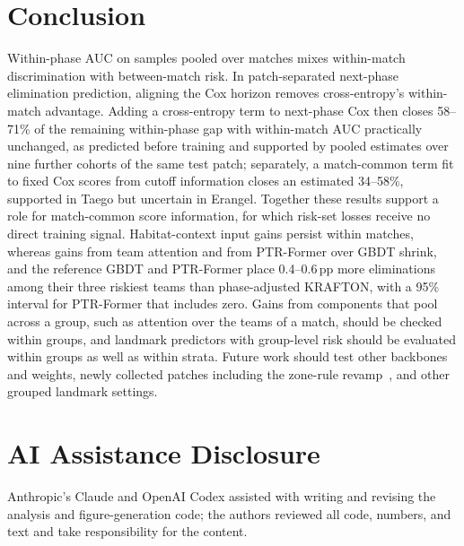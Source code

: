 \documentclass[sigconf,anonymous,nonacm]{acmart}
\begin{document}
\section{Conclusion}
\label{sec:conclusion}
Within-phase AUC on samples pooled over matches mixes within-match discrimination with between-match risk. In patch-separated next-phase elimination prediction, aligning the Cox horizon removes cross-entropy's within-match advantage. Adding a cross-entropy term to next-phase Cox then closes 58--71\% of the remaining within-phase gap with within-match AUC practically unchanged, as predicted before training and supported by pooled estimates over nine further cohorts of the same test patch; separately, a match-common term fit to fixed Cox scores from cutoff information closes an estimated 34--58\%, supported in Taego but uncertain in Erangel. Together these results support a role for match-common score information, for which risk-set losses receive no direct training signal. Habitat-context input gains persist within matches, whereas gains from team attention and from PTR-Former over GBDT shrink, and the reference GBDT and PTR-Former place 0.4--0.6\,pp more eliminations among their three riskiest teams than phase-adjusted KRAFTON, with a 95\% interval for PTR-Former that includes zero. Gains from components that pool across a group, such as attention over the teams of a match, should be checked within groups, and landmark predictors with group-level risk should be evaluated within groups as well as within strata. Future work should test other backbones and weights, newly collected patches including the zone-rule revamp~\cite{PUBGBlueZone2026}, and other grouped landmark settings.

\section*{AI Assistance Disclosure}
Anthropic's Claude and OpenAI Codex assisted with writing and revising the analysis and figure-generation code; the authors reviewed all code, numbers, and text and take responsibility for the content.



\end{document}
